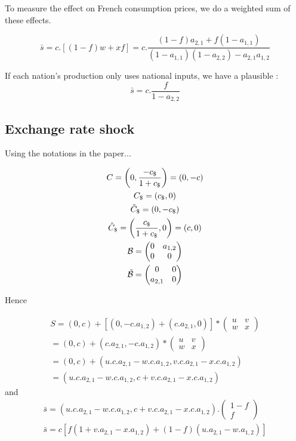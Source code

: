 \documentclass[11pt,a4paper]{article}
\begin{document}
To measure the effect on French consumption prices, we do a weighted sum of these effects.

\begin{equation}
\bar{s}=c.\left[\left(1-f\right)w+xf\right]=c.\frac{\left(1-f\right)a_{2,1}+f\left(1-a_{1,1}\right)}{\left(1-a_{1,1}\right)\left(1-a_{2,2}\right)-a_{2,1}a_{1,2}}
\end{equation}

If each nation's production only uses national inputs, we have a plausible :
\begin{equation*}
\bar{s}=c.\frac{f}{1-a_{2,2}}
\end{equation*}

\subsection{Exchange rate shock}

Using the notations in the paper...

\begin{gather*}
C=\left(0,\frac{-c_\$}{1+c_\$}\right)=\left(0,-c\right)
\\
C_\$=\left(c_\$,0\right)
\\
\tilde{C}_\$=\left(0,-c_\$\right)
\\
\hat{C}_\$=\left(\frac{c_\$}{1+c_\$},0\right)=\left(c,0\right)
\\
\cal B = \left(\begin{matrix}0&a_{1,2}\\0&0\end{matrix}\right)
\\
\tilde{\cal B} = \left(\begin{matrix}0&0\\a_{2,1}&0\end{matrix}\right)
\end{gather*}

Hence

\begin{gather*}
S =\left(0,c\right)+\left[\left(0,-c.a_{1,2}\right)+\left(c.a_{2,1},0\right)\right]*\left(\begin{matrix}u&v\\w&x\end{matrix}\right)
\\
=\left(0,c\right)+\left(c.a_{2,1},-c.a_{1,2}\right)*\left(\begin{matrix}u&v\\w&x\end{matrix}\right)
\\
=\left(0,c\right)+\left(u.c.a_{2,1}-w.c.a_{1,2},v.c.a_{2,1}-x.c.a_{1,2}\right)
\\
=\left(u.c.a_{2,1}-w.c.a_{1,2},c+v.c.a_{2,1}-x.c.a_{1,2}\right)
\end{gather*}
and
\begin{gather*}
\bar{s}=\left(u.c.a_{2,1}-w.c.a_{1,2},c+v.c.a_{2,1}-x.c.a_{1,2}\right).\left(\begin{matrix}1-f\\f\end{matrix}\right)
\\
\bar{s}=c\left[f\left(1+v.a_{2,1}-x.a_{1,2}\right)+\left(1-f\right)\left(u.a_{2,1}-w.a_{1,2}\right)\right]
\end{gather*}
\end{document}
